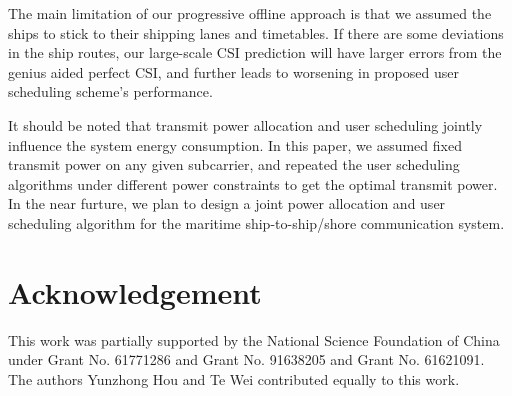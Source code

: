 \documentclass[conference]{IEEEtran}
\begin{document}
 The main limitation of our progressive offline approach is that we assumed the ships to stick to their shipping lanes and timetables. If there are some deviations in the ship routes, our large-scale CSI prediction will have larger errors from the genius aided perfect CSI, and further leads to worsening in proposed user scheduling scheme's performance. 
 
 It should be noted that transmit power allocation and user scheduling jointly  influence the system energy consumption. In this paper, we assumed fixed transmit power on any given subcarrier, and repeated the user scheduling algorithms under different power constraints to get the optimal transmit power. In the near furture, we plan to design a joint power allocation and user scheduling algorithm for the maritime ship-to-ship/shore communication system. 

 
 
 
 \section*{Acknowledgement}
 
 This work was partially supported by the National Science Foundation of China under Grant No. 61771286 and Grant No. 91638205 and Grant No. 61621091. The authors Yunzhong Hou and Te Wei contributed equally to this work.
 
\end{document}

